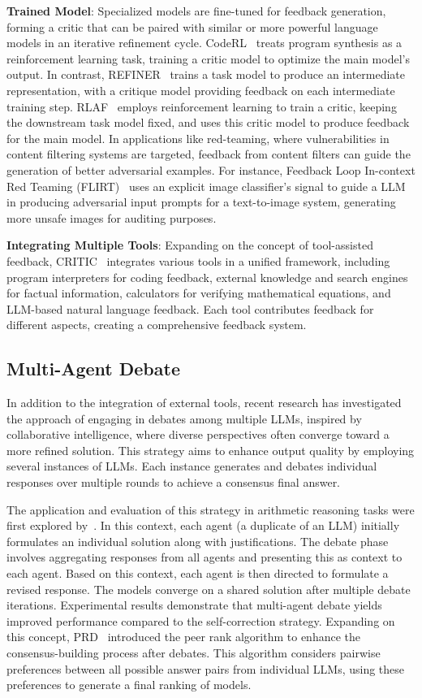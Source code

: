 \documentclass[a4paper,oneside]{book}
\begin{document}
\textbf{Trained Model}: Specialized models are fine-tuned for feedback generation, forming a critic that can be paired with similar or more powerful language models in an iterative refinement cycle. CodeRL~\cite{le2022coderl} treats program synthesis as a reinforcement learning task, training a critic model to optimize the main model's output. In contrast, REFINER~\cite{paul2023refiner} trains a task model to produce an intermediate representation, with a critique model providing feedback on each intermediate training step. RLAF~\cite{akyurek-etal-2023-rl4f} employs reinforcement learning to train a critic, keeping the downstream task model fixed, and uses this critic model to produce feedback for the main model. In applications like red-teaming, where vulnerabilities in content filtering systems are targeted, feedback from content filters can guide the generation of better adversarial examples. For instance, Feedback Loop In-context Red Teaming (FLIRT)~\cite{mehrabi2023flirt} uses an explicit image classifier's signal to guide a LLM in producing adversarial input prompts for a text-to-image system, generating more unsafe images for auditing purposes.

\textbf{Integrating Multiple Tools}: Expanding on the concept of tool-assisted feedback, CRITIC~\cite{gou2023critic} integrates various tools in a unified framework, including program interpreters for coding feedback, external knowledge and search engines for factual information, calculators for verifying mathematical equations, and LLM-based natural language feedback. Each tool contributes feedback for different aspects, creating a comprehensive feedback system.

\subsection{Multi-Agent Debate}
In addition to the integration of external tools, recent research has investigated the approach of engaging in debates among multiple LLMs, inspired by collaborative intelligence, where diverse perspectives often converge toward a more refined solution. This strategy aims to enhance output quality by employing several instances of LLMs. Each instance generates and debates individual responses over multiple rounds to achieve a consensus final answer.

The application and evaluation of this strategy in arithmetic reasoning tasks were first explored by~\cite{du2023improving}. In this context, each agent (a duplicate of an LLM) initially formulates an individual solution along with justifications. The debate phase involves aggregating responses from all agents and presenting this as context to each agent. Based on this context, each agent is then directed to formulate a revised response. The models converge on a shared solution after multiple debate iterations. Experimental results demonstrate that multi-agent debate yields improved performance compared to the self-correction strategy. Expanding on this concept, PRD~\cite{li2023prd} introduced the peer rank algorithm to enhance the consensus-building process after debates. This algorithm considers pairwise preferences between all possible answer pairs from individual LLMs, using these preferences to generate a final ranking of models.
\end{document}
